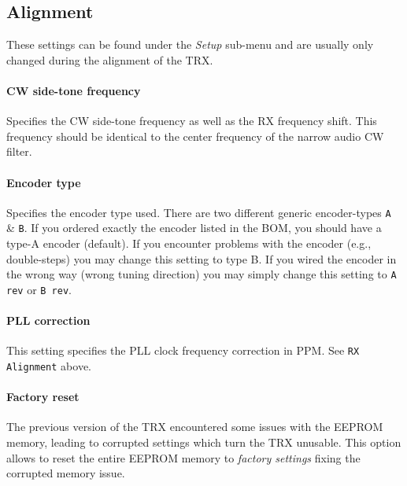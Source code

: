 \documentclass[10pt, a4paper,twoside]{scrartcl}
\begin{document}
\subsection{Alignment}
These settings can be found under the \emph{Setup} sub-menu and are usually only changed during the alignment of the TRX. 

\paragraph{CW side-tone frequency}
Specifies the CW side-tone frequency as well as the RX frequency shift. This frequency should be identical to the center frequency of the narrow audio CW filter.

\paragraph{Encoder type}
Specifies the encoder type used. There are two different generic encoder-types \texttt{A} \& \texttt{B}. If you ordered exactly the encoder listed in the BOM, you should have a type-A encoder (default). If you encounter problems with the encoder (e.g., double-steps) you may change this setting to type B. If you wired the encoder in the wrong way (wrong tuning direction) you may simply change this setting to \texttt{A rev} or \texttt{B rev}. 

\paragraph{PLL correction}
This setting specifies the PLL clock frequency correction in PPM. See \texttt{RX Alignment} above.

\paragraph{Factory reset}
The previous version of the TRX encountered some issues with the EEPROM memory, leading to corrupted settings which turn the TRX unusable. This option allows to reset the entire EEPROM memory to \emph{factory settings} fixing the corrupted memory issue.



\cleardoublepage
\end{document}
